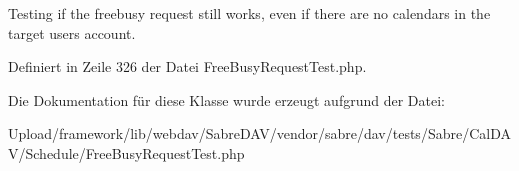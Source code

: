 Testing if the freebusy request still works, even if there are no calendars in the target users\textquotesingle{} account. 

Definiert in Zeile 326 der Datei Free\+Busy\+Request\+Test.\+php.



Die Dokumentation für diese Klasse wurde erzeugt aufgrund der Datei\+:\begin{DoxyCompactItemize}
\item 
Upload/framework/lib/webdav/\+Sabre\+D\+A\+V/vendor/sabre/dav/tests/\+Sabre/\+Cal\+D\+A\+V/\+Schedule/Free\+Busy\+Request\+Test.\+php\end{DoxyCompactItemize}

